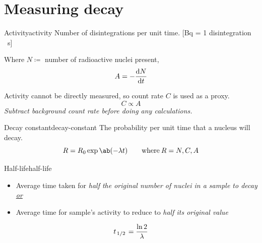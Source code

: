 \section{Measuring decay}
\begin{definition}{Activity}{activity}
	Number of disintegrations per unit time. [\unit{\becquerel} = {\small 1 disintegration \unit{\per\second}}]

	Where \(N \coloneq\) number of radioactive nuclei present,
	\[A = -\odv{N}{t}\]
\end{definition}
Activity cannot be directly measured, so count rate \(C\) is used as a proxy.
\[C \propto A\]
\it{Subtract background count rate} before doing any calculations.

\begin{definition}{Decay constant}{decay-constant}
	The probability per unit time that a nucleus will decay.
	\[R = R_0\exp\ab(-\lambda t)\qquad\text{where}\:R=N, C, A\]
\end{definition}

\begin{definition}{Half-life}{half-life}
	\begin{itemize}
		\item Average time taken for \it{half} the original number of nuclei in a sample to decay \underline{or}
		\item Average time for sample's activity to reduce to \it{half} its original value
	\end{itemize}
	\[t_{\lf{1}{2}} = \f{\ln 2}{\lambda}\]
\end{definition}
